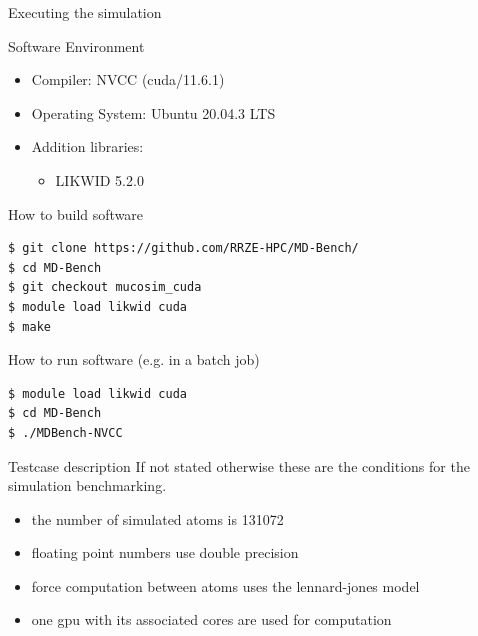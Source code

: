 \documentclass[ignorenonframetext,aspectratio=169]{beamer}
\providecommand{\tightlist}{%
  \setlength{\itemsep}{0pt}\setlength{\parskip}{0pt}}
\begin{document}
\begin{frame}[fragile]{Executing the simulation}
    \begin{block}{Software Environment}
        \begin{itemize}
            \tightlist
            \item Compiler: NVCC (cuda/11.6.1)
            \item Operating System: Ubuntu 20.04.3 LTS
            \item Addition libraries:
            \begin{itemize}
                \tightlist
                \item LIKWID 5.2.0
            \end{itemize}
        \end{itemize}
    \end{block}
    
    \begin{block}{How to build software}
        \begin{verbatim}
$ git clone https://github.com/RRZE-HPC/MD-Bench/
$ cd MD-Bench
$ git checkout mucosim_cuda
$ module load likwid cuda
$ make
        \end{verbatim}
    \end{block}
    \vspace{-\baselineskip}
    \begin{block}{How to run software (e.g. in a batch job)}
        \begin{verbatim}
$ module load likwid cuda
$ cd MD-Bench
$ ./MDBench-NVCC
        \end{verbatim}
    \end{block}
\end{frame}

\begin{frame}[fragile]{Testcase description}
    \vspace*{-6\baselineskip}
    If not stated otherwise these are the conditions for the simulation benchmarking.
    
    \begin{itemize}
        \tightlist
        \item the number of simulated atoms is 131072
        \item floating point numbers use double precision
        \item force computation between atoms uses the lennard-jones model
        \item one gpu with its associated cores are used for computation
    \end{itemize}
\end{frame}
\end{document}

